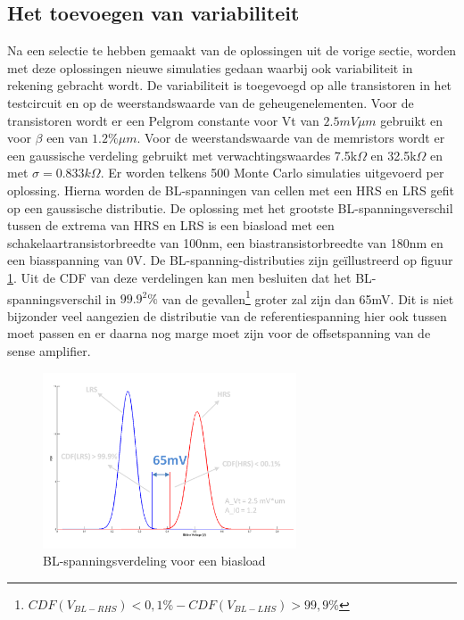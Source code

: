 \subsection{Het toevoegen van variabiliteit}\label{sec:varload}
Na een selectie te hebben gemaakt van de oplossingen uit de vorige sectie, worden met deze oplossingen nieuwe simulaties gedaan waarbij ook variabiliteit in rekening gebracht wordt. De variabiliteit is toegevoegd op alle transistoren in het testcircuit en op de weerstandswaarde van de geheugenelementen. Voor de transistoren wordt er een Pelgrom constante voor Vt van $2.5mV\mu m$ gebruikt en voor $\beta$ een van $1.2\% \mu m$\cite{ppt:variatie}. Voor de weerstandswaarde van de memristors wordt er een gaussische verdeling gebruikt met verwachtingswaardes 7.5k$\Omega$ en 32.5k$\Omega$ en met $\sigma = 0.833k\Omega$. Er worden telkens 500 Monte Carlo simulaties uitgevoerd per oplossing. Hierna worden de BL-spanningen van cellen met een HRS en LRS gefit op een gaussische distributie. De oplossing met het grootste BL-spanningsverschil tussen de extrema van HRS en LRS is een biasload met een schakelaartransistorbreedte van 100nm, een biastransistorbreedte van 180nm en een biasspanning van 0V. De BL-spanning-distributies zijn geïllustreerd op figuur \ref{fig:distbias}. Uit de CDF van deze verdelingen kan men besluiten dat het BL-spanningsverschil in $99.9^2\%$ van de gevallen\footnote{$CDF(V_{BL-RHS})<0,1\%-CDF(V_{BL-LHS})>99,9\%$} groter zal zijn dan 65mV. Dit is niet bijzonder veel aangezien de distributie van de referentiespanning hier ook tussen moet passen en er daarna nog marge moet zijn voor de offsetspanning van de sense amplifier. 

\begin{figure}[!ht]
  \centering
  \includegraphics[width=0.67\textwidth]{../fig/hfdst-last-var1.png}
  \caption{BL-spanningsverdeling voor een biasload}
  \label{fig:distbias}
\end{figure}

